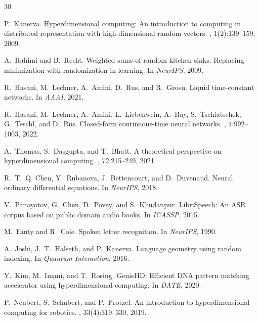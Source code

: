 \documentclass{article}
\begin{document}
\begin{thebibliography}{30}

P.~Kanerva.
\newblock Hyperdimensional computing: An introduction to computing in distributed representation with high-dimensional random vectors.
, 1(2):139--159, 2009.

A.~Rahimi and B.~Recht.
\newblock Weighted sums of random kitchen sinks: Replacing minimization with randomization in learning.
\newblock In {\em NeurIPS}, 2009.

R.~Hasani, M.~Lechner, A.~Amini, D.~Rus, and R.~Grosu.
\newblock Liquid time-constant networks.
\newblock In {\em AAAI}, 2021.

R.~Hasani, M.~Lechner, A.~Amini, L.~Liebenwein, A.~Ray, S.~Tschiatschek, G.~Teschl, and D.~Rus.
\newblock Closed-form continuous-time neural networks.
, 4:992--1003, 2022.

A.~Thomas, S.~Dasgupta, and T.~Bhatt.
\newblock A theoretical perspective on hyperdimensional computing.
, 72:215--249, 2021.

R.~T.~Q. Chen, Y.~Rubanova, J.~Bettencourt, and D.~Duvenaud.
\newblock Neural ordinary differential equations.
\newblock In {\em NeurIPS}, 2018.

V.~Panayotov, G.~Chen, D.~Povey, and S.~Khudanpur.
\newblock LibriSpeech: An {ASR} corpus based on public domain audio books.
\newblock In {\em ICASSP}, 2015.

M.~Fanty and R.~Cole.
\newblock Spoken letter recognition.
\newblock In {\em NeurIPS}, 1990.

A.~Joshi, J.~T.~Halseth, and P.~Kanerva.
\newblock Language geometry using random indexing.
\newblock In {\em Quantum Interaction}, 2016.

Y.~Kim, M.~Imani, and T.~Rosing.
\newblock GenieHD: Efficient {DNA} pattern matching accelerator using hyperdimensional computing.
\newblock In {\em DATE}, 2020.

P.~Neubert, S.~Schubert, and P.~Protzel.
\newblock An introduction to hyperdimensional computing for robotics.
, 33(4):319--330, 2019.


\end{thebibliography}
\end{document}
